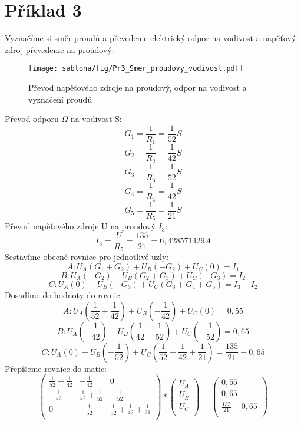 \section{Příklad 3}

Vyznačíme si směr proudů a převedeme elektrický odpor na vodivost a napěťový zdroj převedeme na proudový: 
    \begin{figure}[htb]
    \centering
    \texttt{[image: sablona/fig/Pr3\_Smer\_proudovy\_vodivost.pdf]} \\
    \caption{Převod napěťového zdroje na proudový, odpor na vodivost a vyznačení proudů}
    \end{figure}
\newpage
Převod odporu $\Omega$ na vodivost S:
$$G_1 = \frac{1}{R_1} = \frac{1}{52}S$$
$$G_2 = \frac{1}{R_2} = \frac{1}{42}S$$
$$G_3 = \frac{1}{R_3} = \frac{1}{52}S$$
$$G_4 = \frac{1}{R_4} = \frac{1}{42}S$$
$$G_5 = \frac{1}{R_5} = \frac{1}{21}S$$
\newline
Převod napěťového zdroje U na proudový $I_3$:
$$I_3 = \frac{U}{R_5} = \frac{135}{21} = 6,428571429A$$
\newline
Sestavíme obecné rovnice pro jednotlivé uzly:
$$A: U_A(G_1+G_2) + U_B(-G_2) + U_C(0) = I_1$$
$$B: U_A(-G_2) + U_B(G_2+G_3) + U_C(-G_3) = I_2$$
$$C: U_A(0) + U_B(-G_3) + U_C(G_3 + G_4 + G_5) = I_3 - I_2$$
\newline
Dosadíme do hodnoty do rovnic:
$$A: U_A(\frac{1}{52}+\frac{1}{42}) + U_B(-\frac{1}{42}) + U_C(0) = 0,55$$
$$B: U_A(-\frac{1}{42}) + U_B(\frac{1}{42}+\frac{1}{52}) + U_C(-\frac{1}{52}) = 0,65$$
$$C: U_A(0) + U_B(-\frac{1}{52}) + U_C(\frac{1}{52}+\frac{1}{42}+\frac{1}{21}) = \frac{135}{21} - 0,65$$
\newline
Přepíšeme rovnice do matic:
\[
\left(
\begin{array}{ccc}
\frac{1}{52}+\frac{1}{42} & -\frac{1}{42} & 0\\
-\frac{1}{42} & \frac{1}{42}+\frac{1}{52} & -\frac{1}{52}\\
0 & -\frac{1}{52} & \frac{1}{52}+\frac{1}{42}+\frac{1}{21}\\
\end{array}
\right)
*
\left(
\begin{array}{c}
U_A\\
U_B\\
U_C\\
\end{array}
\right)
=
\left(
\begin{array}{c}
0,55\\
0,65\\
\frac{135}{21}-0,65\\
\end{array}
\right)
\]

